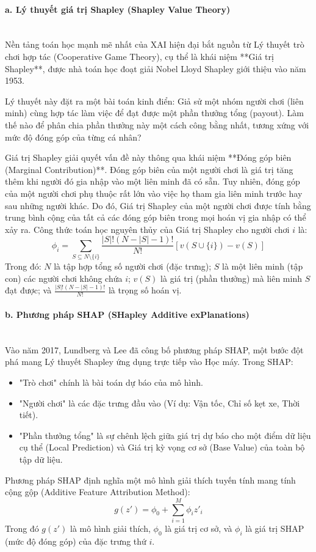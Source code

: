 \paragraph{a. Lý thuyết giá trị Shapley (Shapley Value Theory)} \mbox{} \\
Nền tảng toán học mạnh mẽ nhất của XAI hiện đại bắt nguồn từ Lý thuyết trò chơi hợp tác (Cooperative Game Theory), cụ thể là khái niệm **Giá trị Shapley**, được nhà toán học đoạt giải Nobel Lloyd Shapley giới thiệu vào năm 1953.

Lý thuyết này đặt ra một bài toán kinh điển: Giả sử một nhóm người chơi (liên minh) cùng hợp tác làm việc để đạt được một phần thưởng tổng (payout). Làm thế nào để phân chia phần thưởng này một cách công bằng nhất, tương xứng với mức độ đóng góp của từng cá nhân?

Giá trị Shapley giải quyết vấn đề này thông qua khái niệm **Đóng góp biên (Marginal Contribution)**. Đóng góp biên của một người chơi là giá trị tăng thêm khi người đó gia nhập vào một liên minh đã có sẵn. Tuy nhiên, đóng góp của một người chơi phụ thuộc rất lớn vào việc họ tham gia liên minh trước hay sau những người khác. Do đó, Giá trị Shapley của một người chơi được tính bằng trung bình cộng của tất cả các đóng góp biên trong mọi hoán vị gia nhập có thể xảy ra. Công thức toán học nguyên thủy của Giá trị Shapley cho người chơi $i$ là:
$$\phi_i = \sum_{S \subseteq N \setminus \{i\}} \frac{|S|! (N - |S| - 1)!}{N!} [v(S \cup \{i\}) - v(S)]$$
Trong đó: $N$ là tập hợp tổng số người chơi (đặc trưng); $S$ là một liên minh (tập con) các người chơi không chứa $i$; $v(S)$ là giá trị (phần thưởng) mà liên minh $S$ đạt được; và $\frac{|S|! (N - |S| - 1)!}{N!}$ là trọng số hoán vị.

\paragraph{b. Phương pháp SHAP (SHapley Additive exPlanations)} \mbox{} \\
Vào năm 2017, Lundberg và Lee đã công bố phương pháp SHAP, một bước đột phá mang Lý thuyết Shapley ứng dụng trực tiếp vào Học máy. Trong SHAP:
\begin{itemize}
    \item "Trò chơi" chính là bài toán dự báo của mô hình.
    \item "Người chơi" là các đặc trưng đầu vào (Ví dụ: Vận tốc, Chỉ số kẹt xe, Thời tiết).
    \item "Phần thưởng tổng" là sự chênh lệch giữa giá trị dự báo cho một điểm dữ liệu cụ thể (Local Prediction) và Giá trị kỳ vọng cơ sở (Base Value) của toàn bộ tập dữ liệu.
\end{itemize}
Phương pháp SHAP định nghĩa một mô hình giải thích tuyến tính mang tính cộng gộp (Additive Feature Attribution Method):
$$g(z') = \phi_0 + \sum_{i=1}^{M} \phi_i z'_i$$
Trong đó $g(z')$ là mô hình giải thích, $\phi_0$ là giá trị cơ sở, và $\phi_i$ là giá trị SHAP (mức độ đóng góp) của đặc trưng thứ $i$.


